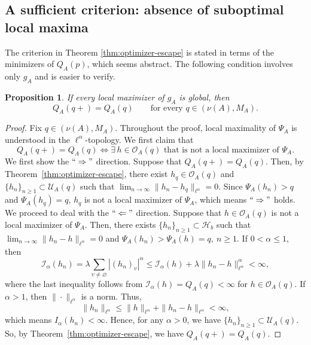 \documentclass[a4paper, 11pt]{article}
\newcommand{\1}{\mathbf 1}
\theoremstyle{plain}
\newtheorem{proposition}[theorem]{Proposition}
\begin{document}
\subsection{A sufficient criterion: absence of suboptimal local maxima}
The criterion in Theorem \ref{thm:optimizer-escape} is stated in terms
of the minimizers of $Q_A(p)$, which seems abstract.
The following condition involves only \(g_A\) and is easier to verify.

\begin{proposition}
\label{cor:no-suboptimal-maxima}
If every local maximizer of \(g_A\) is global, then
\[
  Q_A(q+)=Q_A(q)
  \qquad\text{for every }q\in(\nu(A),M_A).
\]
\end{proposition}

\begin{proof}
Fix \(q\in(\nu(A),M_A)\). Throughout the proof, local maximality of $\Psi_A$ is understood in the \(\ell^\alpha\)-topology. We first claim that
\begin{equation}
Q_A(q+)=Q_A(q)\Longleftrightarrow
\exists\,h\in \mathcal O_A(q)\text{ that is not a local maximizer of }\Psi_A.
\label{eq:local-max-equivalence}
\end{equation}
We first show the $``\Rightarrow"$ direction. Suppose that $Q_A(q+)=Q_A(q)$. Then, by Theorem~\ref{thm:optimizer-escape}, there exist $h_q\in\mathcal O_A(q)$ and \(\{h_n\}_{n\geq1}\subset\mathcal U_A(q)\) such that
$\lim_{n\to\infty}\|h_n-h_q\|_{\ell^\alpha}=0$. Since $\Psi_A(h_n)>q$ and $\Psi_A(h_q)=q$, $h_q$ is not a local maximizer of $\Psi_A$, which means $``\Rightarrow"$ holds. We proceed to deal with the $``\Leftarrow"$ direction. Suppose that \(h\in \mathcal O_A(q)\) is not a local maximizer of \(\Psi_A\). Then, there exists \(\{h_n\}_{n\geq1}\subset\mathcal H_b\) such that \(\lim_{n\to\infty}\|h_n-h\|_{\ell^\alpha}=0\) and \(\Psi_A(h_n)>\Psi_A(h)=q,~n\geq1\). If \(0<\alpha\leq1\), then
\begin{equation*}
\mathcal{I_{\alpha}}(h_n)=\lambda\sum_{v\neq\varnothing}|(h_n)_v|^\alpha
\leq \mathcal{I_{\alpha}}(h)+\lambda \|h_n-h\|^{\alpha}_{\ell^\alpha}
<\infty,
\end{equation*}
where the last inequality follows from  $\mathcal{I_{\alpha}}(h)=Q_A(q)<\infty$ for \(h\in \mathcal O_A(q)\).
If \(\alpha>1\), then $\|\cdot\|_{\ell^\alpha}$ is a norm. Thus,
\begin{equation*}
\|h_n\|_{\ell^\alpha}
\leq
\|h\|_{\ell^\alpha}
+
\|h_n-h\|_{\ell^\alpha}
<\infty,
\end{equation*}
which means \(I_\alpha(h_n)<\infty\). Hence, for any $\alpha>0$, we have \(\{h_n\}_{n\geq1}\subset\mathcal U_A(q)\). So, by Theorem~\ref{thm:optimizer-escape}, we have $Q_A(q+)=Q_A(q)$.

\end{proof}
\end{document}
